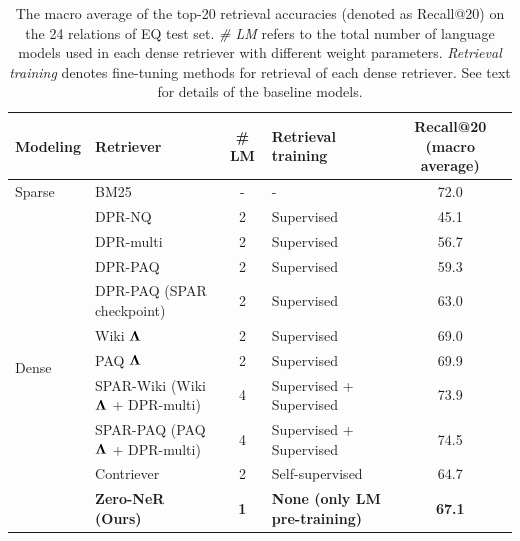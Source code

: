 \documentclass[letterpaper]{article} %
\begin{document}
\begin{table}[t]
	\centering
	\renewcommand{\arraystretch}{1.15}
	\begin{tabular}{llclc}
		\toprule
		\textbf{Modeling}       & \textbf{Retriever}                          & \textbf{\# LM} & \textbf{Retrieval training}          & \textbf{Recall@20 (macro average)} \\
		\midrule
		Sparse                  & BM25                                        & -              & -                                    & 72.0                               \\
		\hline
		\multirow{10}{*}{Dense} & DPR-NQ                                      & 2              & Supervised                           & 45.1                               \\
		                        & DPR-multi                                   & 2              & Supervised                           & 56.7                               \\
		                        & DPR-PAQ \citep{sciavolino-etal-2021-simple} & 2              & Supervised                           & 59.3                               \\
		                        & DPR-PAQ (SPAR checkpoint)                   & 2              & Supervised                           & 63.0                               \\
		                        & Wiki $\bf{\Lambda}$                         & 2              & Supervised                           & 69.0                               \\
		                        & PAQ $\bf{\Lambda}$                          & 2              & Supervised                           & 69.9                               \\
		                        & SPAR-Wiki (Wiki $\bf{\Lambda}$ + DPR-multi) & 4              & Supervised + Supervised              & 73.9                               \\
		                        & SPAR-PAQ (PAQ $\bf{\Lambda}$ + DPR-multi)   & 4              & Supervised + Supervised              & 74.5                               \\
		\cline{2-5}
		                        & Contriever                                  & 2              & Self-supervised                      & 64.7                               \\
		\cline{2-5}
		                        & \textbf{Zero-NeR (Ours)}                    & \textbf{1}     & \textbf{None (only LM pre-training)} & \textbf{67.1}                      \\
		\bottomrule
	\end{tabular}
	\caption{
		The macro average of the top-20 retrieval accuracies (denoted as Recall@20) on the 24 relations of EQ test set.
		\textit{\# LM} refers to the total number of language models used in each dense retriever with different weight parameters.
		\textit{Retrieval training} denotes fine-tuning methods for retrieval of each dense retriever.
		See text for details of the baseline models.
	}
	\label{tab:acc}
\end{table}
\end{document}
